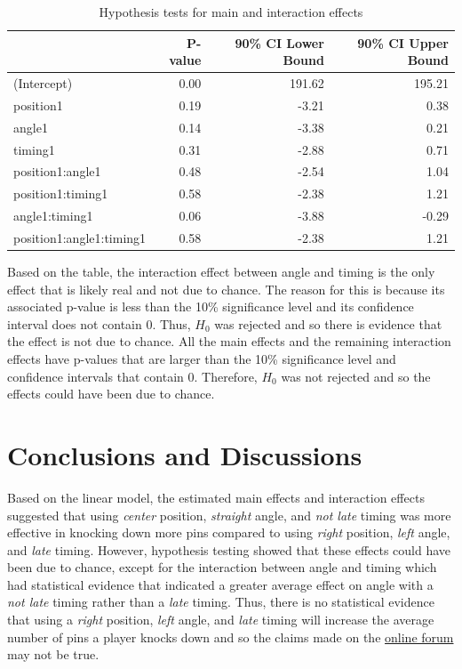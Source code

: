 \documentclass[
]{article}
\begin{document}
\begin{table}[H]

\caption{\label{tab:lmtable2}Hypothesis tests for main and interaction effects}
\centering
\begin{tabular}[t]{lrrr}
\toprule
  & P-value & 90\% CI Lower Bound & 90\% CI Upper Bound\\
\midrule
\rowcolor[HTML]{F5F9FF}  (Intercept) & 0.00 & 191.62 & 195.21\\
position1 & 0.19 & -3.21 & 0.38\\
\rowcolor[HTML]{F5F9FF}  angle1 & 0.14 & -3.38 & 0.21\\
timing1 & 0.31 & -2.88 & 0.71\\
\rowcolor[HTML]{F5F9FF}  position1:angle1 & 0.48 & -2.54 & 1.04\\
position1:timing1 & 0.58 & -2.38 & 1.21\\
\rowcolor[HTML]{F5F9FF}  angle1:timing1 & 0.06 & -3.88 & -0.29\\
position1:angle1:timing1 & 0.58 & -2.38 & 1.21\\
\bottomrule
\end{tabular}
\end{table}

Based on the table, the interaction effect between angle and timing is the only effect that is likely real and not due to chance. The reason for this is because its associated p-value is less than the 10\% significance level and its confidence interval does not contain 0. Thus, \(H_0\) was rejected and so there is evidence that the effect is not due to chance. All the main effects and the remaining interaction effects have p-values that are larger than the 10\% significance level and confidence intervals that contain 0. Therefore, \(H_0\) was not rejected and so the effects could have been due to chance.

\hypertarget{conclusions-and-discussions}{%
\section{Conclusions and Discussions}\label{conclusions-and-discussions}}

Based on the linear model, the estimated main effects and interaction effects suggested that using \emph{center} position, \emph{straight} angle, and \emph{not late} timing was more effective in knocking down more pins compared to using \emph{right} position, \emph{left} angle, and \emph{late} timing. However, hypothesis testing showed that these effects could have been due to chance, except for the interaction between angle and timing which had statistical evidence that indicated a greater average effect on angle with a \emph{not late} timing rather than a \emph{late} timing. Thus, there is no statistical evidence that using a \emph{right} position, \emph{left} angle, and \emph{late} timing will increase the average number of pins a player knocks down and so the claims made on the \href{https://strategywiki.org/wiki/Wii_Sports/Bowling}{online forum} may not be true.
\end{document}
